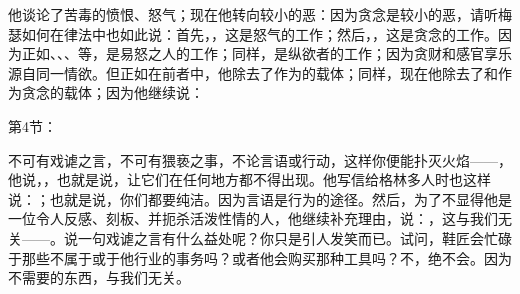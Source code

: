 他谈论了苦毒的愤恨、怒气；现在他转向较小的恶：因为贪念是较小的恶，请听梅瑟如何在律法中也如此说：首先，，这是怒气的工作；然后，，这是贪念的工作。因为正如、、、等，是易怒之人的工作；同样，是纵欲者的工作；因为贪财和感官享乐源自同一情欲。但正如在前者中，他除去了作为的载体；同样，现在他除去了和作为贪念的载体；因为他继续说：\par

第4节：\par

不可有戏谑之言，不可有猥亵之事，不论言语或行动，这样你便能扑灭火焰——，他说，，也就是说，让它们在任何地方都不得出现。他写信给格林多人时也这样说：；也就是说，你们都要纯洁。因为言语是行为的途径。然后，为了不显得他是一位令人反感、刻板、并扼杀活泼性情的人，他继续补充理由，说：，这与我们无关——。说一句戏谑之言有什么益处呢？你只是引人发笑而已。试问，鞋匠会忙碌于那些不属于或于他行业的事务吗？或者他会购买那种工具吗？不，绝不会。因为不需要的东西，与我们无关。\par

